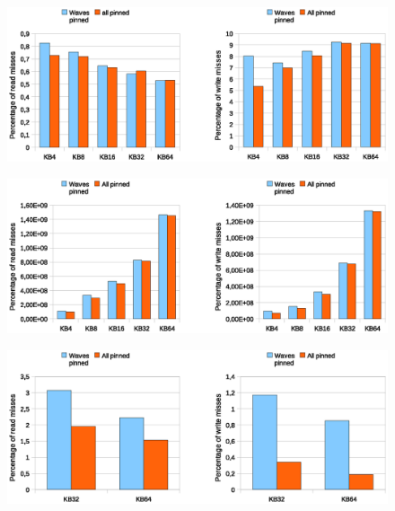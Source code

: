 \begin{figure}[htbp]
\centering
\includegraphics[width=\widefigure]{images/cpuaff/cpuaff_l1_load_store_Xeon.eps}
\caption{}
\label{fig:cpuaff_l1_load_store_xeon}
\end{figure}

\begin{figure}[htbp]
\centering
\includegraphics[width=\widefigure]{images/cpuaff/cpuaff_acc_l2_load_store_Xeon.eps}
\caption{}
\label{fig:cpuaff_acc_l2_load_store_xeon}
\end{figure}

\begin{figure}[htbp]
\centering
\includegraphics[width=\widefigure]{images/cpuaff/cpuaff_l2_load_store_Xeon.eps}
\caption{}
\label{fig:cpuaff_l2_load_store_xeon}
\end{figure}
\newpage

